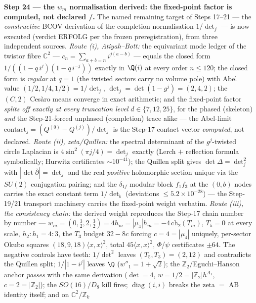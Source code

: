\documentclass[11pt,a4paper]{article}
\newcommand{\Z}{\mathbb{Z}}
\theoremstyle{definition}
\begin{document}
\par\smallskip\noindent\textbf{Step 24 --- the $w_m$ normalisation derived: the fixed-point
factor is computed, not declared \mE/\mC.} The named remaining target of Steps 17--21 --- the
\emph{constructive} BCOV derivation of the completion normalisation $1/\det_j$ --- is now
executed (verdict ERFOLG per the frozen preregistration), from three independent sources.
\emph{Route (i), Atiyah--Bott:} the equivariant mode ledger of the twistor fibre $\mathbb C^2$
--- $c_n = \sum_{a+b=n} i^{j(a-b)}$ --- equals the closed form $1/((1-q\,i^j)(1-q\,i^{-j}))$
exactly in $\Q(i)$ at every order $n \le 120$; the closed form is \emph{regular} at $q = 1$
(the twisted sectors carry no volume pole) with Abel value $(1/2, 1/4, 1/2) = 1/\det_j$,
$\det_j = \det(1-g^j) = (2, 4, 2)$; the $(C,2)$ Ces\`aro means converge in exact arithmetic;
and the fixed-point factor \emph{splits off exactly at every truncation level} $d \in
\{7, 12, 25\}$, for the phased (skeleton) \emph{and} the Step-21-forced unphased (completion)
trace alike --- the Abel-limit $\mathrm{contact}_j = (Q^{(0)} - Q^{(j)})/\det_j$ is the Step-17
contact vector \emph{computed}, not declared. \emph{Route (ii), zeta/Quillen:} the spectral
determinant of the $g^j$-twisted circle Laplacian is $4\sin^2(\pi j/4) = \det_j$ exactly
(Lerch $+$ reflection formula symbolically; Hurwitz certificates $\sim 10^{-41}$); the Quillen
split gives $\det\Delta = \det_j^2$ with $|\det\bar\partial| = \det_j$ and the real
\emph{positive} holomorphic section unique via the $SU(2)$ conjugation pairing; and the
$\delta_{1f}$ modular block $f_1f_3$ at the $(0,b)$ nodes carries the exact constant term
$1/\det_b$ (deviations $\le 5.2\times10^{-28}$) --- the Step-19/21 transport machinery carries
the fixed-point weight verbatim. \emph{Route (iii), the consistency chain:} the derived weight
reproduces the Step-17 chain number by number --- $w_m = (0, \tfrac32, 2, \tfrac32) = 4h_m =
|\mu_4|h_m = -4\,\mathrm{ch}_2(T_m)$, $T_5 = 0$ at every scale, $h_2 : h_1 = 4 : 3$, the $T_3$
budget $32 - 8c$ forcing $c = 4 = |\mu_4|$ uniquely, per-sector Okubo squares
$(18, 9, 18)\langle x,x\rangle^2$, total $45\langle x,x\rangle^2$, $\Phi$/$\psi$ certificates
$\pm64$. The negative controls have teeth: $1/\det^2$ leaves $(T_5, T_3) = (2, 12)$ and
contradicts the Quillen split; $1/|1-i^j|$ leaves $\Q$ ($w''_1 = 1+\sqrt2$); the
$\Z_2$/Eguchi--Hanson anchor \emph{passes} with the same derivation ($\det = 4$,
$w = 1/2 = |\Z_2|h^{A_1}$, $c = 2 = |\Z_2|$); the $SO(16)/D_8$ kill fires;
$\operatorname{diag}(i,i)$ breaks the zeta $=$ AB identity itself; and on $\mathbb C^2/\Z_k$
\end{document}
